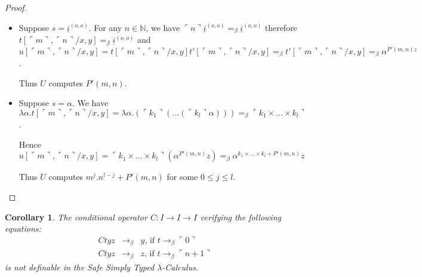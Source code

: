 \documentclass{article}
\newtheorem{corollary}[theorem]{Corollary}
\newcommand{\encode}[1]{\ulcorner #1 \urcorner}
\newcommand{\nat}{\mathbb{N}}
\begin{document}
\begin{proof}
\begin{itemize}
\begin{itemize}
\item Suppose $s= \underline{i}^{(o,o)}$.
For any $n \in \nat$, we have $\encode{n} \underline{i}^{(o,o)} =_\beta \underline{i}^{(o,o)}$ therefore $t[\encode{m}, \encode{n}/x,y] =_\beta \underline{i}^{(o,o)}$ and $u[\encode{m}, \encode{n}/x,y] = t [\encode{m}, \encode{n}/x,y] t' [\encode{m}, \encode{n}/x,y] =_\beta t' [\encode{m}, \encode{n}/x,y] =_\beta \alpha^{P'(m,n) z}$.

Thus $U$ computes $P'(m,n)$.

\item Suppose $s=\alpha$. 
We have
$\lambda \alpha . t[\encode{m}, \encode{n}/x,y] = \lambda \alpha . (\encode{k_1} (\ldots (\encode{k_l} \alpha))) =_\beta \encode{k_1 \times \ldots \times k_l}$.

Hence  $u[\encode{m}, \encode{n}/x,y] = \encode{k_1 \times \ldots \times k_l} (\alpha^{P'(m,n)} z)=_\beta \alpha^{k_1 \times \ldots \times k_l + P'(m,n)} z$

Thus $U$ computes $m^j . n^{l-j} + P'(m,n)$ for some $0\leq j \leq l$.
\end{itemize}
\end{itemize}
\end{proof}

\begin{corollary}
The conditional operator $C:I\rightarrow I\rightarrow I$ verifying the following equations:
\begin{eqnarray*}
C t y z &\rightarrow_\beta& y \mbox{, if } t \rightarrow_\beta \encode{0} \\
C t y z &\rightarrow_\beta& z \mbox{, if } t \rightarrow_\beta \encode{n+1}
\end{eqnarray*}
is not definable in the Safe Simply Typed $\lambda$-Calculus.
\end{corollary}





\end{document}
